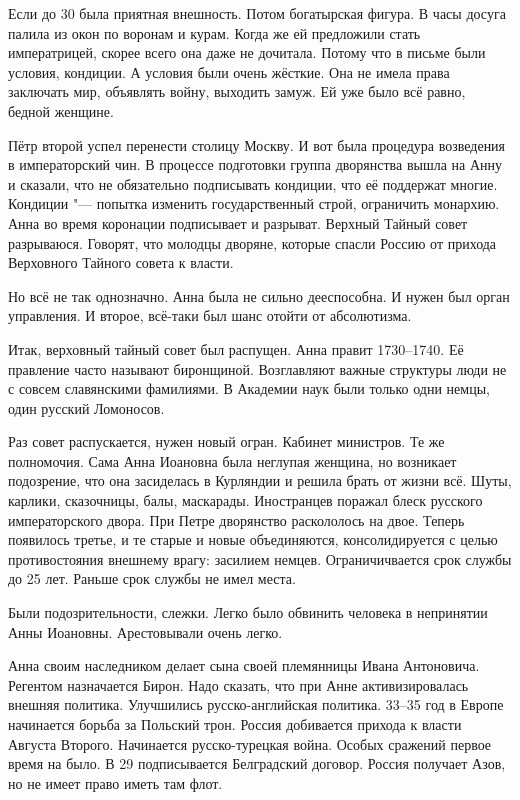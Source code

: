 Если до 30 была приятная внешность. Потом богатырская фигура. В часы досуга палила из окон по воронам и курам. Когда же ей предложили стать императрицей, скорее всего она даже не дочитала. Потому что в письме были условия, кондиции. А условия были очень жёсткие. Она не имела права заключать мир, объявлять войну, выходить замуж. Ей уже было всё равно, бедной женщине.

Пётр второй успел перенести столицу Москву. И вот была процедура возведения в императорский чин. В процессе подготовки группа дворянства вышла на Анну и сказали, что не обязательно подписывать кондиции, что её поддержат многие. Кондиции "--- попытка изменить государственный строй, ограничить монархию. Анна во время коронации подписывает и разрыват. Верхный Тайный совет разрываюся. Говорят, что молодцы дворяне, которые спасли Россию от прихода Верховного Тайного совета к власти.

Но всё не так однозначно. Анна была не сильно дееспособна. И нужен был орган управления. И второе, всё-таки был шанс отойти от абсолютизма.

Итак, верховный тайный совет был распущен. Анна правит 1730--1740. Её правление часто называют биронщиной. Возглавляют важные структуры люди не с совсем славянскими фамилиями. В Академии наук были только одни немцы, один русский Ломоносов.

Раз совет распускается, нужен новый огран. Кабинет министров. Те же полномочия. Сама Анна Иоановна была неглупая женщина, но возникает подозрение, что она засиделась в Курляндии и решила брать от жизни всё. Шуты, карлики, сказочницы, балы, маскарады. Иностранцев поражал блеск русского императорского двора. При Петре дворянство раскололось на двое. Теперь появилось третье, и те старые и новые объединяются, консолидируется с целью противостояния внешнему врагу: засилием немцев. Ограничичвается срок службы до 25 лет. Раньше срок службы не имел места.

Были подозрительности, слежки. Легко было обвинить человека в непринятии Анны Иоановны. Арестовывали очень легко.

Анна своим наследником делает сына своей племянницы Ивана Антоновича. Регентом назначается Бирон. Надо сказать, что при Анне активизировалась внешняя политика. Улучшились русско-английская политика. 33--35 год в Европе начинается борьба за Польский трон. Россия добивается прихода к власти Августа Второго. Начинается русско-турецкая война. Особых сражений первое время на было. В 29 подписывается Белградский договор. Россия получает Азов, но не имеет право иметь там флот.


